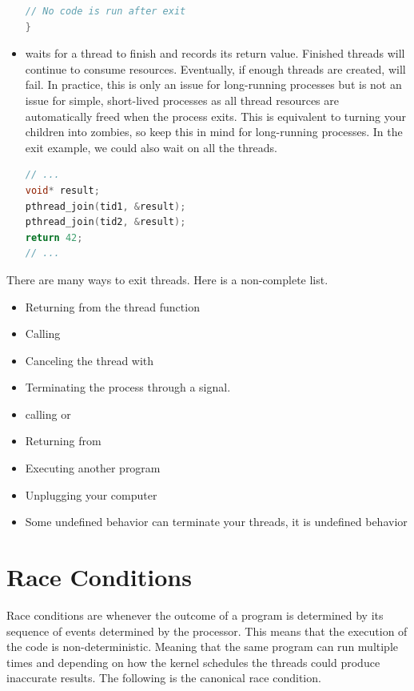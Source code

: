 \begin{itemize}
\begin{lstlisting}[language=C]
  // No code is run after exit
}
\end{lstlisting}

\item {} waits for a thread to finish and records its return value.
Finished threads will continue to consume resources.
Eventually, if enough threads are created,  will fail.
In practice, this is only an issue for long-running processes but is not an issue for simple, short-lived processes as all thread resources are automatically freed when the process exits.
This is equivalent to turning your children into zombies, so keep this in mind for long-running processes. In the exit example, we could also wait on all the threads.

\begin{lstlisting}[language=C]
// ...
void* result;
pthread_join(tid1, &result);
pthread_join(tid2, &result);
return 42;
// ...
\end{lstlisting}


\end{itemize}

There are many ways to exit threads.
Here is a non-complete list.

\begin{itemize}
\item Returning from the thread function
\item Calling 
\item Canceling the thread with 
\item Terminating the process through a signal.
\item calling  or 
\item Returning from 
\item Executing another program
\item Unplugging your computer
\item Some undefined behavior can terminate your threads, it is undefined behavior
\end{itemize}

\section{Race Conditions}

Race conditions are whenever the outcome of a program is determined by its sequence of events determined by the processor.
This means that the execution of the code is non-deterministic.
Meaning that the same program can run multiple times and depending on how the kernel schedules the threads could produce inaccurate results.
The following is the canonical race condition.

